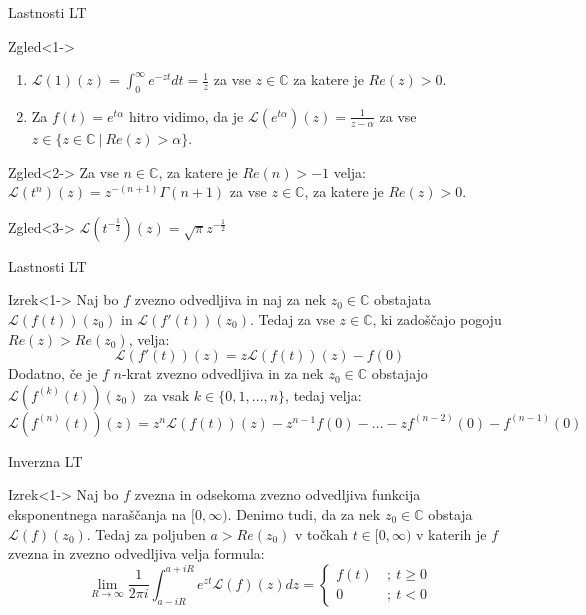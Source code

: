 \documentclass[t, 8pt]{beamer} %
\newcommand{\mth}[1]{\ensuremath{\mathbb{#1}}}
\newcommand{\C}{\mth{C}}
\newcommand{\fillblack}[1]{
	\begin{tikzpicture}[remember picture, overlay]
		\node [shift={(0 cm,0cm)}]  at (current page.south west)
		{%
			\begin{tikzpicture}[remember picture, overlay] at (current page.south west)
				\draw [fill=black] (0, 0) -- (0,#1 \paperheight) --
				(\paperwidth,#1 \paperheight) -- (\paperwidth,0) -- cycle ;
			\end{tikzpicture}
		};
		\draw (current page.north west) rectangle (current page.south east);
	\end{tikzpicture}
}
\begin{document}
		\begin{frame}{Lastnosti LT}
			\begin{block}{Zgled}<1->
				\begin{enumerate}
				\item $\mathcal{L}(1)(z) = \int_{0}^{\infty}e^{-zt}dt = \frac{1}{z}$ za vse $z\in\C$ za katere je $Re(z) > 0$. \item Za $f(t) = e^{t\alpha}$ hitro vidimo, da je $\mathcal{L}(e^{t\alpha})(z) = \frac{1}{z-\alpha}$ za vse $z\in \{z\in\C~|~Re(z) > \alpha\}$.
				\end{enumerate}
			\end{block}
			\begin{block}{Zgled}<2->
				Za vse $n\in\C$, za katere je $Re(n)>-1$ velja: $\mathcal{L}(t^n)(z)=z^{-(n+1)}\Gamma(n+1)$ za vse $z\in\C$, za katere je $Re(z) > 0$.
			\end{block}
			\begin{block}{Zgled}<3->
				$\mathcal{L}(t^{-\frac{1}{2}})(z) = \sqrt{\pi}z^{-\frac{1}{2}}$
			\end{block}
		\end{frame}
		
		\begin{frame}{Lastnosti LT}
			\begin{block}{Izrek}<1->
				Naj bo $f$ zvezno odvedljiva in naj za nek $z_0\in\C$ obstajata $\mathcal{L}(f(t))(z_0)$ in $\mathcal{L}(f'(t))(z_0)$. Tedaj za vse $z\in\C$, ki zadoščajo pogoju $Re(z) > Re(z_0)$, velja: $$\mathcal{L}(f'(t))(z) = z\mathcal{L}(f(t))(z) - f(0)$$
				Dodatno, če je $f$ $n$-krat zvezno odvedljiva in za nek $z_0\in\C$ obstajajo $\mathcal{L}(f^{(k)}(t))(z_0)$ za vsak $k\in\{0, 1, \ldots, n\}$, tedaj velja: $$\mathcal{L}(f^{(n)}(t))(z) = z^n\mathcal{L}(f(t))(z) - z^{n-1}f(0) - \ldots -zf^{(n-2)}(0) -  f^{(n-1)}(0)$$
			\end{block}
		\end{frame}
		
		\begin{frame}{Inverzna LT}
			\begin{block}{Izrek}<1->
				Naj bo $f$ zvezna in odsekoma zvezno odvedljiva funkcija eksponentnega naraščanja na $[0, \infty)$. Denimo tudi, da za nek $z_0\in\C$ obstaja $\mathcal{L}(f)(z_0)$. Tedaj za poljuben $a>Re(z_0)$ v točkah $t \in [0, \infty)$ v katerih je $f$ zvezna in zvezno odvedljiva velja formula: $$\lim_{R\to\infty}\frac{1}{2\pi i}\int_{a-iR}^{a+iR}e^{zt}\mathcal{L}(f)(z)dz = \begin{cases}
					f(t)~&;~ t\geq 0 \\
					0~&;~ t < 0
				\end{cases}$$
			\end{block}
		\end{frame}
		
\end{document}
